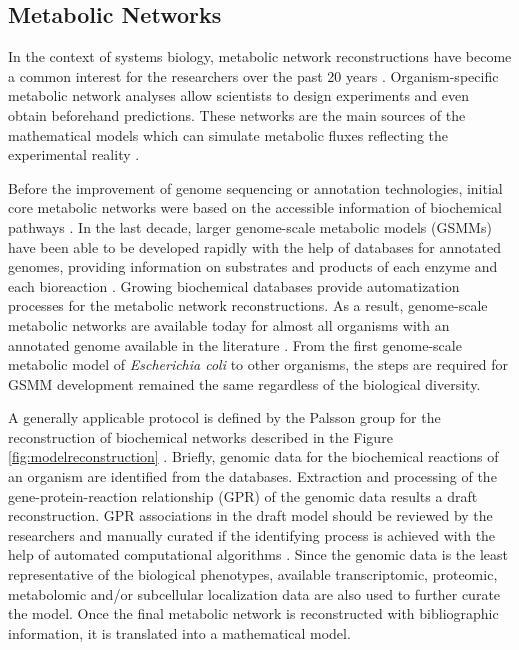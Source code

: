 \subsection{Metabolic Networks}   \label{metabolicnetworks}
In the context of systems biology, metabolic network reconstructions have become a common interest for the researchers over the past 20 years \cite{thiele2010protocol}. Organism-specific metabolic network analyses allow scientists to design experiments and even obtain beforehand predictions. These networks are the main sources of the mathematical models which can simulate metabolic fluxes reflecting the experimental reality \cite{orth2010flux}.

Before the improvement of genome sequencing or annotation technologies, initial core metabolic networks were based on the accessible information of biochemical pathways \cite{vallino1994carbon} \cite{varma1993biochemical}. In the last decade, larger genome-scale metabolic models (GSMMs) have been able to be developed rapidly with the help of databases for annotated genomes, providing information on substrates and products of each enzyme and each bioreaction \cite{feist2009reconstruction}. Growing biochemical databases provide automatization processes for the metabolic network reconstructions. As a result, genome-scale metabolic networks are available today for almost all organisms with an annotated genome available in the literature \cite{pitkanen2014comparative, kerkhoven2014applications}. From the first genome-scale metabolic model of \emph{Escherichia coli} to other organisms, the steps are required for GSMM development remained the same regardless of the biological diversity.

A generally applicable protocol is defined by the Palsson group \cite{thiele2010protocol, feist2009reconstruction} for the reconstruction of biochemical networks described in the Figure \ref{fig:modelreconstruction} \cite{chen2012metabolic}. Briefly, genomic data for the biochemical reactions of an organism are identified from the databases. Extraction and processing of the gene-protein-reaction relationship (GPR) of the genomic data results a draft reconstruction. GPR associations in the draft model should be reviewed by the researchers and manually curated if the identifying process is achieved with the help of automated computational algorithms \cite{pitkanen2014comparative}. Since the genomic data is the least representative of the biological phenotypes, available transcriptomic, proteomic, metabolomic and/or subcellular localization data are also used to further curate the model. Once the final metabolic network is reconstructed with bibliographic information, it is translated into a mathematical model.

